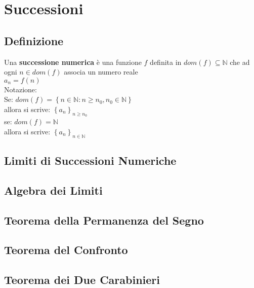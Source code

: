 \documentclass[a4paper, twoside, italian, 11pt]{book}
\newcommand{\braces}[1] {\left \{ #1 \right \}}
\newcommand{\N}{\mathbb{N}}
\begin{document}



\chapter{Successioni}



\section{Definizione}

\noindent
Una \textbf{successione numerica} è una funzione $f$ definita in $dom(f) \subseteq \N$ che ad ogni $n \in dom(f)$ associa un numero reale \\

$a_n = f(n)$ \\

\noindent
Notazione: \\

Se: $dom(f) = \braces{n \in \N : n \geq n_0, n_0 \in \N}$ \\

allora si scrive: $\braces{a_n}_{n \geq n_0}$ \\

se: $dom(f) = \N$ \\

allora si scrive: $\braces{a_n}_{n \in \N}$ \\




\section{Limiti di Successioni Numeriche}




\section{Algebra dei Limiti}




\section{Teorema della Permanenza del Segno}




\section{Teorema del Confronto}




\section{Teorema dei Due Carabinieri}

\end{document}
